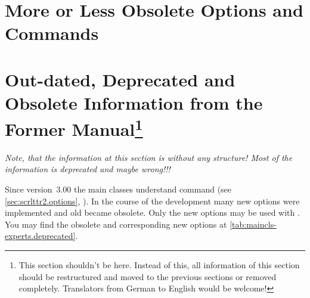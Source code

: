 \begin{Declaration}
  \\
  \\
  \\
  \\
\end{Declaration}
%
%
%
%
%
%
%
%
%
%
%


\section{More or Less Obsolete Options and Commands}
\label{sec:maincls-experts.obsolete}



\section{Out-dated, Deprecated and Obsolete Information from the Former
  \KOMAScript{} Manual\protect\footnote{This section shouldn't be here. Instead of this, all information of this
  section should be restructured and moved to the previous sections or removed
  completely. Translators from German to English would be welcome!}}
\label{sec:maincls-experts.deprecated}

\emph{Note, that the information at this section is without any structure!
  Most of the information is deprecated and maybe wrong!!!}

Since version~3.00 the main classes understand command 
(see \autoref{sec:scrlttr2.options},
).  In the course of the
development many new options were implemented and old became obsolete.  Only
the new options may be used with .  You may find the
obsolete and corresponding new options at
\autoref{tab:maincls-experts.deprecated}.

